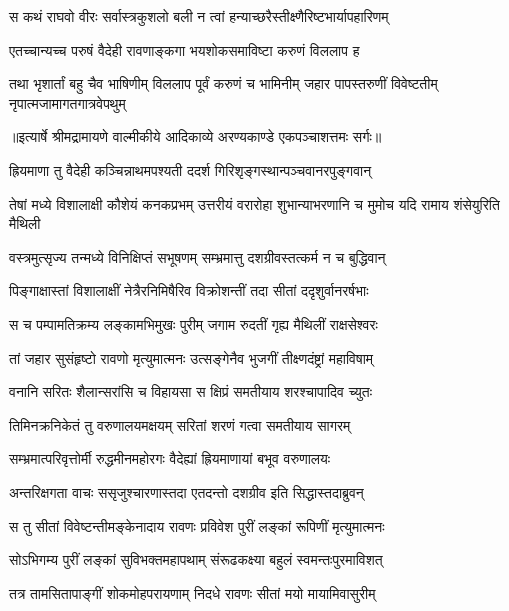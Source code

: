 \twolineshloka
{स कथं राघवो वीरः सर्वास्त्रकुशलो बली}
{न त्वां हन्याच्छरैस्तीक्ष्णैरिष्टभार्यापहारिणम्} %

\twolineshloka
{एतच्चान्यच्च परुषं वैदेही रावणाङ्कगा}
{भयशोकसमाविष्टा करुणं विललाप ह} %

\fourlineindentedshloka
{तथा भृशार्तां बहु चैव भाषिणीम्}
{विललाप पूर्वं करुणं च भामिनीम्}
{जहार पापस्तरुणीं विवेष्टतीम्}
{नृपात्मजामागतगात्रवेपथुम्} %


{॥इत्यार्षे श्रीमद्रामायणे वाल्मीकीये आदिकाव्ये अरण्यकाण्डे एकपञ्चाशत्तमः सर्गः॥}


\twolineshloka
{ह्रियमाणा तु वैदेही कञ्चिन्नाथमपश्यती}
{ददर्श गिरिशृङ्गस्थान्पञ्चवानरपुङ्गवान्} %

\threelineshloka
{तेषां मध्ये विशालाक्षी कौशेयं कनकप्रभम्}
{उत्तरीयं वरारोहा शुभान्याभरणानि च}
{मुमोच यदि रामाय शंसेयुरिति मैथिली} %

\twolineshloka
{वस्त्रमुत्सृज्य तन्मध्ये विनिक्षिप्तं सभूषणम्}
{सम्भ्रमात्तु दशग्रीवस्तत्कर्म न च बुद्धिवान्} %

\twolineshloka
{पिङ्गाक्षास्तां विशालाक्षीं नेत्रैरनिमिषैरिव}
{विक्रोशन्तीं तदा सीतां ददृशुर्वानरर्षभाः} %

\twolineshloka
{स च पम्पामतिक्रम्य लङ्कामभिमुखः पुरीम्}
{जगाम रुदतीं गृह्य मैथिलीं राक्षसेश्वरः} %

\twolineshloka
{तां जहार सुसंहृष्टो रावणो मृत्युमात्मनः}
{उत्सङ्गेनैव भुजगीं तीक्ष्णदंष्ट्रां महाविषाम्} %

\twolineshloka
{वनानि सरितः शैलान्सरांसि च विहायसा}
{स क्षिप्रं समतीयाय शरश्चापादिव च्युतः} %

\twolineshloka
{तिमिनक्रनिकेतं तु वरुणालयमक्षयम्}
{सरितां शरणं गत्वा समतीयाय सागरम्} %

\twolineshloka
{सम्भ्रमात्परिवृत्तोर्मी रुद्धमीनमहोरगः}
{वैदेह्यां ह्रियमाणायां बभूव वरुणालयः} %

\twolineshloka
{अन्तरिक्षगता वाचः ससृजुश्चारणास्तदा}
{एतदन्तो दशग्रीव इति सिद्धास्तदाब्रुवन्} %

\twolineshloka
{स तु सीतां विवेष्टन्तीमङ्केनादाय रावणः}
{प्रविवेश पुरीं लङ्कां रूपिणीं मृत्युमात्मनः} %

\twolineshloka
{सोऽभिगम्य पुरीं लङ्कां सुविभक्तमहापथाम्}
{संरूढकक्ष्या बहुलं स्वमन्तःपुरमाविशत्} %

\twolineshloka
{तत्र तामसितापाङ्गीं शोकमोहपरायणाम्}
{निदधे रावणः सीतां मयो मायामिवासुरीम्} %

